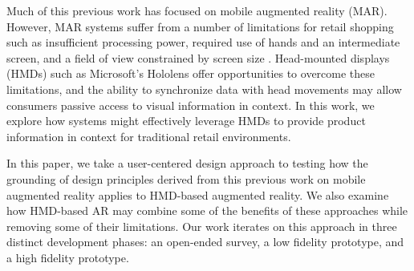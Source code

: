 Much of this previous work has focused on mobile augmented reality (MAR). However, MAR systems suffer from a number of limitations for retail shopping such as insufficient processing power, required use of hands and an intermediate screen, and a field of view constrained by screen size \cite{bimber2005spatial}. Head-mounted displays (HMDs) such as Microsoft's Hololens offer opportunities to overcome these limitations, and the ability to synchronize data with head movements may allow consumers passive access to visual information in context. In this work, we explore how systems might effectively leverage HMDs to provide product information in context for traditional retail environments. 


In this paper, we take a user-centered design approach to testing how the grounding of design principles derived from this previous work on mobile augmented reality applies to HMD-based augmented reality. We also examine how HMD-based AR may combine some of the benefits of these approaches while removing some of their limitations. Our work iterates on this approach in three distinct development phases: an open-ended survey, a low fidelity prototype, and a high fidelity prototype.